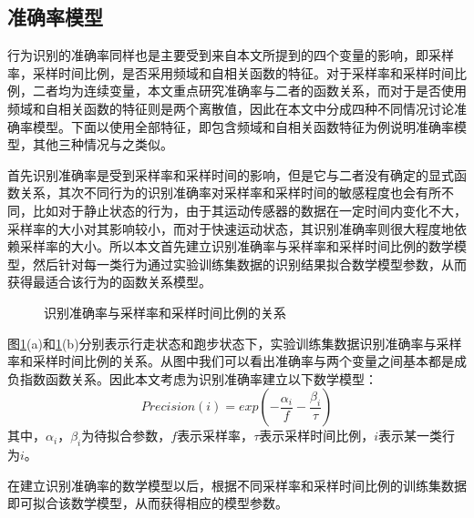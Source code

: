 \subsection{准确率模型}
\par 行为识别的准确率同样也是主要受到来自本文所提到的四个变量的影响，即采样率，采样时间比例，是否采用频域和自相关函数的特征。对于采样率和采样时间比例，二者均为连续变量，本文重点研究准确率与二者的函数关系，而对于是否使用频域和自相关函数的特征则是两个离散值，因此在本文中分成四种不同情况讨论准确率模型。下面以使用全部特征，即包含频域和自相关函数特征为例说明准确率模型，其他三种情况与之类似。
\par 首先识别准确率是受到采样率和采样时间的影响，但是它与二者没有确定的显式函数关系，其次不同行为的识别准确率对采样率和采样时间的敏感程度也会有所不同，比如对于静止状态的行为，由于其运动传感器的数据在一定时间内变化不大，采样率的大小对其影响较小，而对于快速运动状态，其识别准确率则很大程度地依赖采样率的大小。所以本文首先建立识别准确率与采样率和采样时间比例的数学模型，然后针对每一类行为通过实验训练集数据的识别结果拟合数学模型参数，从而获得最适合该行为的函数关系模型。

\begin{figure}[!htb]
    \centering
    \caption{识别准确率与采样率和采样时间比例的关系}\label{precision}
\end{figure}

\par 图\ref{precision}(a)和\ref{precision}(b)分别表示行走状态和跑步状态下，实验训练集数据识别准确率与采样率和采样时间比例的关系。从图中我们可以看出准确率与两个变量之间基本都是成负指数函数关系。因此本文考虑为识别准确率建立以下数学模型：
\begin{equation}
	Precision(i) = exp(-\frac{\alpha_i}{f} - \frac{\beta_i}{\tau})
\end{equation}
其中，$\alpha_i$，$\beta_i$为待拟合参数，$f$表示采样率，$\tau$表示采样时间比例，$i$表示某一类行为$i$。
\par 在建立识别准确率的数学模型以后，根据不同采样率和采样时间比例的训练集数据即可拟合该数学模型，从而获得相应的模型参数。
